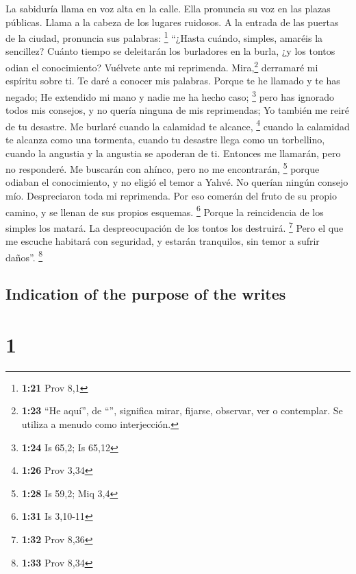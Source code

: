 \begin{paracol}{2}
 La sabiduría llama en voz alta en la calle. Ella
pronuncia su voz en las plazas públicas.  Llama a la
cabeza de los lugares ruidosos. A la entrada de las puertas de la
ciudad, pronuncia sus palabras: \footnote{\textbf{1:21} Prov 8,1}
 ``¿Hasta cuándo, simples, amaréis la sencillez? Cuánto
tiempo se deleitarán los burladores en la burla, ¿y los tontos odian el
conocimiento?  Vuélvete ante mi reprimenda.
Mira,\footnote{\textbf{1:23} ``He aquí'', de ``'', significa
  mirar, fijarse, observar, ver o contemplar. Se utiliza a menudo como
  interjección.} derramaré mi espíritu sobre ti. Te daré a conocer mis
palabras.  Porque te he llamado y te has negado; He
extendido mi mano y nadie me ha hecho caso; \footnote{\textbf{1:24} Is
  65,2; Is 65,12}  pero has ignorado todos mis consejos,
y no quería ninguna de mis reprimendas;  Yo también me
reiré de tu desastre. Me burlaré cuando la calamidad te alcance,
\footnote{\textbf{1:26} Prov 3,34}  cuando la calamidad
te alcanza como una tormenta, cuando tu desastre llega como un
torbellino, cuando la angustia y la angustia se apoderan de ti.
 Entonces me llamarán, pero no responderé. Me buscarán
con ahínco, pero no me encontrarán, \footnote{\textbf{1:28} Is 59,2; Miq
  3,4}  porque odiaban el conocimiento, y no eligió el
temor a Yahvé.  No querían ningún consejo mío.
Despreciaron toda mi reprimenda.  Por eso comerán del
fruto de su propio camino, y se llenan de sus propios esquemas.
\footnote{\textbf{1:31} Is 3,10-11}  Porque la
reincidencia de los simples los matará. La despreocupación de los tontos
los destruirá. \footnote{\textbf{1:32} Prov 8,36}  Pero
el que me escuche habitará con seguridad, y estarán tranquilos, sin
temor a sufrir daños''. \footnote{\textbf{1:33} Prov 8,34}

\switchcolumn
\begin{otherlanguage}{english}

\hypertarget{indication-of-the-purpose-of-the-writes}{%
\subsection{Indication of the purpose of the
writes}\label{indication-of-the-purpose-of-the-writes}}

\hypertarget{section-1}{%
\section{1}\label{section-1}}


\end{otherlanguage}
\end{paracol}

